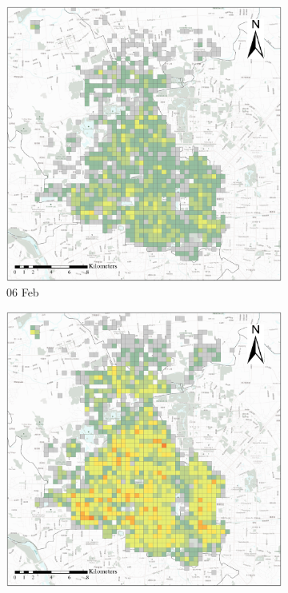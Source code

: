 \documentclass[preprints,ijgi,submit,moreauthors]{Definitions/mdpi}
\begin{document}
\begin{figure}[ht]
    \vspace{6pt}
    \begin{subfigure}{.23\textwidth}
        \includegraphics[width=\textwidth]{Figures/Overall_spatial_patterns/FN5_D2020_02_06.eps}
        \caption{06 Feb}
    \end{subfigure}
    \begin{subfigure}{.23\textwidth}
        \includegraphics[width=\textwidth]{Figures/Overall_spatial_patterns/FN5_D2020_02_10.eps}

\end{subfigure}
\end{figure}
\end{document}
